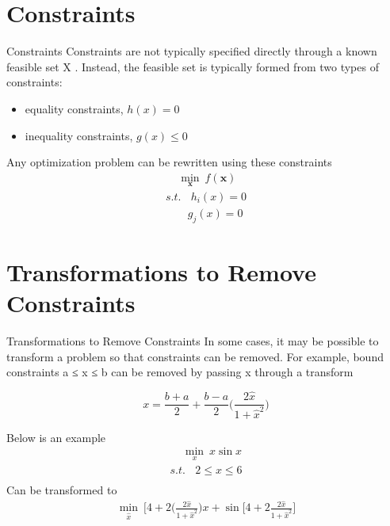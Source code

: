 \documentclass{beamer}
\begin{document}
\section{Constraints}
\begin{frame}{Constraints}
Constraints are not typically specified directly through a known feasible set X . Instead, the feasible set is typically formed from two types of constraints:

\begin{itemize}
    \item equality constraints, $h(x)=0$ 
    \item inequality constraints, $g(x) \leq 0$
    
\end{itemize}

Any optimization problem can be rewritten using these constraints
\begin{gather*}
    ~~~~~ \underset{\boldsymbol{x}}{\min} ~ f(\boldsymbol{x})\\
    {s.t.}~~~~ h_i(x) = 0 \\
    ~~~~~~~~~ g_j(x) = 0
\end{gather*}

\end{frame}

\section{Transformations to Remove Constraints}
\begin{frame}{Transformations to Remove Constraints}
In some cases, it may be possible to transform a problem so that constraints can be removed. For example, bound constraints a ≤ x ≤ b can be removed by passing x through a transform

\begin{equation*}
x = \frac{b+a}{2} + \frac{b-a}{2}\bigg(\frac{2\hat{x}}{1+\hat{x}^2}\bigg)
\end{equation*}

Below is an example
\begin{gather*}
    ~~~~~ \underset{x}{\min} ~ x\sin{x}\\
    {s.t.}~~~~ 2\leq x \leq 6 \\
\end{gather*}
Can be transformed to 
\begin{gather*}
    \underset{\hat{x}}{\min} ~ \bigg[4+2\bigg(\frac{2\hat{x}}{1+\hat{x}^2}\bigg)x
    + \sin \bigg[ 4 + 2\frac{2\hat{x}}{1+\hat{x}^2}\bigg]
\end{gather*}

\end{frame}
\end{document}
